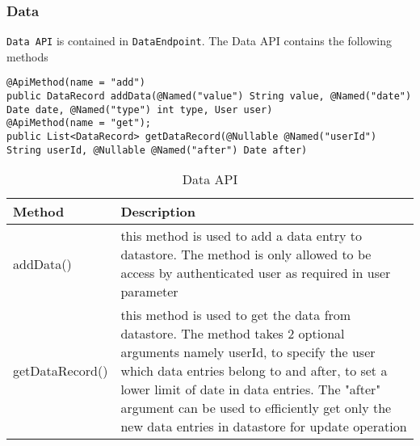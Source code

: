 \subsubsection{Data}
\texttt{Data API} is contained in \texttt{DataEndpoint}. The Data API contains the following methods \\
\begin{minipage}{\linewidth}
\begin{lstlisting}
@ApiMethod(name = "add")
public DataRecord addData(@Named("value") String value, @Named("date") Date date, @Named("type") int type, User user)
@ApiMethod(name = "get");
public List<DataRecord> getDataRecord(@Nullable @Named("userId") String userId, @Nullable @Named("after") Date after)
\end{lstlisting}
\end{minipage}

\begin{table}
\begin{center}
    \begin{tabularx}{\textwidth}{|l|X|}
        \hline Method & Description \\
        \hline addData() & 
            this method is used to add a data entry to datastore. The method is only allowed to be access by
            authenticated user as required in user parameter \\
        \hline getDataRecord() &
            this method is used to get the data from datastore. The method takes 2 optional arguments namely userId, to
            specify the user which data entries belong to and after, to set a lower limit of date in data entries. The
            "after" argument can be used to efficiently get only the new data entries in datastore for update operation
            \\
        \hline
    \end{tabularx}
\end{center}
\caption{Data API}
\end{table}

